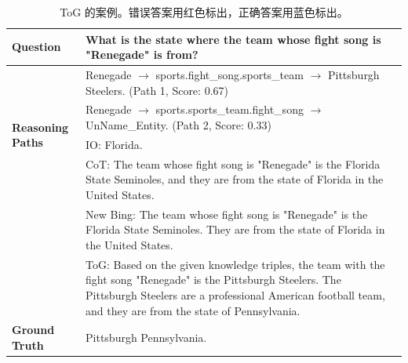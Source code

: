 \documentclass[11pt,UTF8,fontset=fandol]{ctexart}
\newcommand{\wrong}[1]{\textcolor{wrongred}{#1}}
\newcommand{\correct}[1]{\textcolor{rightblue}{#1}}
\begin{document}
\begin{table}[H]\centering
\caption{ToG 的案例。错误答案用\wrong{红色}标出，正确答案用\correct{蓝色}标出。}
\label{tab:20}
\small
\renewcommand{\arraystretch}{1.25}
\begin{tabular}{p{}p{}}
\toprule
\textbf{Question} & What is the state where the team whose fight song is "Renegade" is from? \\
\midrule
\multirow{4}{*}{\parbox{0.16\textwidth}{\textbf{Reasoning Paths}}}
& Renegade $\rightarrow$ sports.fight\_song.sports\_team $\rightarrow$ Pittsburgh Steelers. (Path 1, Score: 0.67) \\
& Renegade $\rightarrow$ sports.sports\_team.fight\_song $\rightarrow$ UnName\_Entity. (Path 2, Score: 0.33) \\
\midrule
\multirow{4}{*}{\textbf{Outputs}}
& IO: \wrong{Florida.} \\
& CoT: The team whose fight song is "Renegade" is the Florida State Seminoles, and they are from the state of \wrong{Florida} in the United States. \\
& New Bing: The team whose fight song is "Renegade" is the Florida State Seminoles. They are from the state of \wrong{Florida} in the United States. \\
& ToG: Based on the given knowledge triples, the team with the fight song "Renegade" is the Pittsburgh Steelers. The Pittsburgh Steelers are a professional American football team, and they are from the state of \correct{Pennsylvania}. \\
\midrule
\textbf{Ground Truth} & Pittsburgh Pennsylvania. \\
\bottomrule
\end{tabular}
\end{table}
\end{document}

